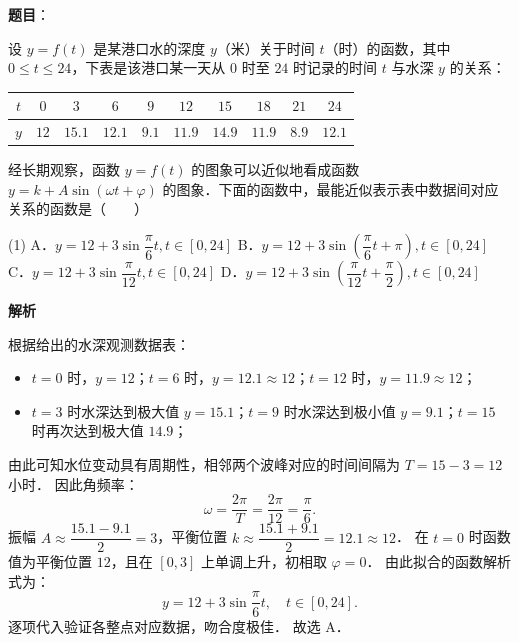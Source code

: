 \begin{answer}

\textbf{题目}：

设 $y = f(t)$ 是某港口水的深度 $y$（米）关于时间 $t$（时）的函数，其中 $0 \leqslant t \leqslant 24$，下表是该港口某一天从 $0$ 时至 $24$ 时记录的时间 $t$ 与水深 $y$ 的关系：

\begin{center}
\begingroup\setlength{\tabcolsep}{4pt}
\begin{tabular}{cccccccccc}
\toprule
$t$ & $0$ & $3$ & $6$ & $9$ & $12$ & $15$ & $18$ & $21$ & $24$ \\
\midrule
$y$ & $12$ & $15.1$ & $12.1$ & $9.1$ & $11.9$ & $14.9$ & $11.9$ & $8.9$ & $12.1$ \\
\bottomrule
\end{tabular}
\endgroup
\end{center}

经长期观察，函数 $y = f(t)$ 的图象可以近似地看成函数 $y = k + A\sin(\omega t + \varphi)$ 的图象．下面的函数中，最能近似表示表中数据间对应关系的函数是\mbox{（　　）}

\begin{gkopts}(1)
\task A．$y = 12 + 3\sin\dfrac{\pi}{6}t, t \in [0, 24]$
\task B．$y = 12 + 3\sin\left(\dfrac{\pi}{6}t + \pi\right), t \in [0, 24]$
\task C．$y = 12 + 3\sin\dfrac{\pi}{12}t, t \in [0, 24]$
\task D．$y = 12 + 3\sin\left(\dfrac{\pi}{12}t + \dfrac{\pi}{2}\right), t \in [0, 24]$
\end{gkopts}

\textbf{解析}

根据给出的水深观测数据表：
\begin{itemize}
\item $t = 0$ 时，$y = 12$；$t = 6$ 时，$y = 12.1 \approx 12$；$t = 12$ 时，$y = 11.9 \approx 12$；
\item $t = 3$ 时水深达到极大值 $y = 15.1$；$t = 9$ 时水深达到极小值 $y = 9.1$；$t = 15$ 时再次达到极大值 $14.9$；
\end{itemize}
由此可知水位变动具有周期性，相邻两个波峰对应的时间间隔为 $T = 15 - 3 = 12$ 小时．
因此角频率：
\nopagebreak[4]
\[
\omega = \frac{2\pi}{T} = \frac{2\pi}{12} = \frac{\pi}{6}.
\]
振幅 $A \approx \dfrac{15.1 - 9.1}{2} = 3$，平衡位置 $k \approx \dfrac{15.1 + 9.1}{2} = 12.1 \approx 12$．
在 $t = 0$ 时函数值为平衡位置 $12$，且在 $[0, 3]$ 上单调上升，初相取 $\varphi = 0$．
由此拟合的函数解析式为：
\nopagebreak[4]
\[
y = 12 + 3\sin\frac{\pi}{6}t, \quad t \in [0, 24].
\]
逐项代入验证各整点对应数据，吻合度极佳．
故选 A．


\end{answer}

